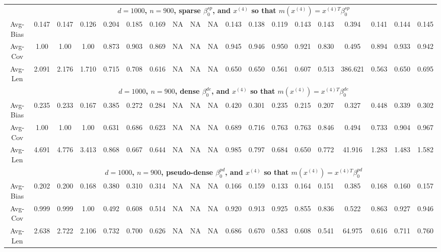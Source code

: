 \documentclass[ejsv2,noshowframe]{imsart}
\theoremstyle{plain}
\theoremstyle{definition}
\theoremstyle{remark}
\begin{document}
\begin{table}[hbtp!]
\begin{center}
{\begin{tabular}{ccccccccccccccccccc}
		& \multicolumn{18}{c}{\bf $d=1000$, $n = 900$, sparse $\beta_0^{sp}$, and $x^{(4)}$ so that $m(x^{(4)})=x^{(4)T}\beta_0^{sp}$} \\ \cline{2-19}
		Avg-Bias & 0.147 & 0.147 & 0.126 & 0.204 & 0.185 & 0.169 & NA & NA & NA & 0.143 & 0.138 & 0.119 & 0.143 & 0.143 & 0.394 & 0.141 & 0.144 & 0.145 \\
		Avg-Cov & 1.00 & 1.00 & 1.00 & 0.873 & 0.903 & 0.869 & NA & NA & NA & 0.945 & 0.946 & 0.950 & 0.921 & 0.830 & 0.495 & 0.894 & 0.933 & 0.942 \\
		Avg-Len & 2.091 & 2.176 & 1.710 & 0.715 & 0.708 & 0.616 & NA & NA & NA & 0.650 & 0.650 & 0.561 & 0.607 & 0.513 & 386.621 & 0.563 & 0.650 & 0.695 \\
		\cline{2-19}
		
		& \multicolumn{18}{c}{\bf $d=1000$, $n = 900$, dense $\beta_0^{de}$, and $x^{(4)}$ so that $m(x^{(4)})=x^{(4)T}\beta_0^{de}$} \\ \cline{2-19}
		Avg-Bias & 0.235 & 0.233 & 0.167 & 0.385 & 0.272 & 0.284 & NA & NA & NA & 0.420 & 0.301 & 0.235 & 0.215 & 0.207 & 0.327 & 0.448 & 0.339 & 0.302 \\
		Avg-Cov & 1.00 & 1.00 & 1.00 & 0.631 & 0.686 & 0.623 & NA & NA & NA & 0.689 & 0.716 & 0.763 & 0.763 & 0.846 & 0.494 & 0.733 & 0.904 & 0.967 \\
		Avg-Len & 4.691 & 4.776 & 3.413 & 0.868 & 0.667 & 0.644 & NA & NA & NA & 0.985 & 0.797 & 0.684 & 0.650 & 0.772 & 41.916 & 1.283 & 1.483 & 1.582 \\
		\cline{2-19}
		
		& \multicolumn{18}{c}{\bf $d=1000$, $n = 900$, pseudo-dense $\beta_0^{pd}$, and $x^{(4)}$ so that $m(x^{(4)})=x^{(4)T}\beta_0^{pd}$} \\ \cline{2-19}
		Avg-Bias & 0.202 & 0.200 & 0.168 & 0.380 & 0.310 & 0.314 & NA & NA & NA & 0.166 & 0.159 & 0.133 & 0.164 & 0.151 & 0.385 & 0.168 & 0.160 & 0.157 \\
		Avg-Cov & 0.999 & 0.999 & 1.00 & 0.492 & 0.608 & 0.514 & NA & NA & NA & 0.920 & 0.913 & 0.925 & 0.855 & 0.836 & 0.522 & 0.863 & 0.927 & 0.946 \\
		Avg-Len & 2.638 & 2.722 & 2.106 & 0.732 & 0.700 & 0.626 & NA & NA & NA & 0.686 & 0.670 & 0.583 & 0.608 & 0.541 & 64.975 & 0.616 & 0.711 & 0.760 \\
		\hline
		

\end{tabular}}
\end{center}
\end{table}
\end{document}

